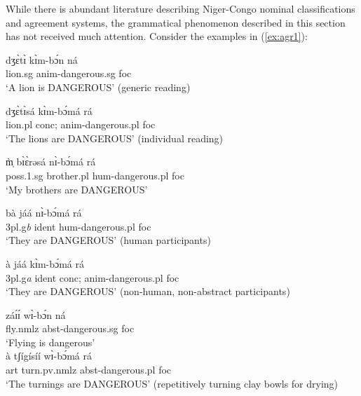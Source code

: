 \begin{exe}
\begin{exe}
\begin{exe}
{\begin{exe}
\begin{exe}
\begin{exe}
\begin{exe}
\begin{exe}
\begin{exe}
\begin{exe}
\begin{xlist}
\begin{exe}
\begin{exe}
\begin{exe}
\begin{exe}
\begin{exe}
\begin{exe}
\begin{exe}
\begin{exe}
\begin{exe}
\begin{exe}
\begin{exe}
\begin{exe}
\begin{exe}
 While there is abundant  literature describing Niger-Congo nominal
classifications and
agreement systems, the grammatical phenomenon  described in
this section  has not received much attention.  Consider the examples in
(\ref{ex:agr1}):      


\ea\label{ex:agr1}



\ea\label{ex:agrA}
\gll  dʒɛ̀tɪ̀ kɪ̀m-bɔ́n  ná\\
  lion.{\sc sg}  {\sc anim}-dangerous.{\sc sg}  {\sc foc} \\
\glt  `A lion is DANGEROUS' (generic reading) 



\ex\label{ex:agrB}
\gll    dʒɛ̀tɪ̀sá kɪ̀m-bɔ́má  rá \\
  lion.{\sc pl}  {\sc  conc; anim}-dangerous.{\sc pl} {\sc foc} \\
\glt  `The lions are DANGEROUS' (individual reading) 



\ex\label{ex:agrD}
\gll   m̩̀ bɪ̀ɛ̀rəsá  nɪ̀-bɔ́má  rá \\
{\sc poss.1.sg} {brother.{\sc pl}}  {\sc hum}-dangerous.{\sc pl} {\sc foc} \\
\glt  `My brothers are DANGEROUS'


\ex\label{ex:agrE}
\gll    bà  jáá  nɪ̀-bɔ́má   rá \\
{{\sc  3pl.g}{\it b}} {\sc ident} {\sc hum}-{dangerous.{\sc pl}} {\sc foc}  \\
\glt  `They are DANGEROUS' (human participants) 



\ex\label{ex:agrF}
\gll   à   jáá   kɪ̀m-bɔ́má  rá\\
{{\sc  3pl.g}{\it a}} {\sc ident}  {\sc  conc; anim}-{dangerous.{\sc pl}}
{\sc foc} \\
\glt  `They are DANGEROUS' (non-human, non-abstract participants) 



\ex\label{ex:agrG}
\gll záɪ́ɪ́   wɪ̀-bɔ́n ná \\
 fly.{\sc nmlz} {\sc abst}-dangerous.{\sc sg}  {\sc foc} \\
\glt  `Flying is dangerous'  \\




\ex\label{ex:agrH}
\gll à tʃígísíí wɪ̀-bɔ́má rá\\
{\sc art}  turn.{\sc pv.nmlz}  {\sc abst}-dangerous.{\sc pl}  {\sc 
foc}
\\
\glt  `The turnings  are DANGEROUS' (repetitively turning clay bowls for
drying) \\



\end{exe}
\end{exe}
\end{exe}
\end{exe}
\end{exe}
\end{exe}
\end{exe}
\end{exe}
\end{exe}
\end{exe}
\end{exe}
\end{exe}
\end{exe}
\end{xlist}
\end{exe}
\end{exe}
\end{exe}
\end{exe}
\end{exe}
\end{exe}
\end{exe}}
\end{exe}
\end{exe}
\end{exe}
